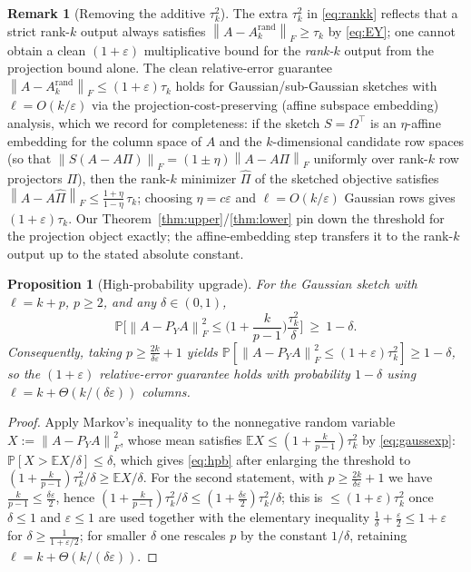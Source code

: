 \documentclass{amsart}
\newtheorem{proposition}{Proposition}
\theoremstyle{definition}
\newtheorem{remark}{Remark}
\newcommand{\Frob}[1]{\left\lVert #1\right\rVert_F}
\newcommand{\E}{\mathbb{E}}
\newcommand{\Prob}{\mathbb{P}}
\begin{document}
\begin{remark}[Removing the additive $\tau_k^2$]\label{rem:sube}
The extra $\tau_k^2$ in \eqref{eq:rankk} reflects that a strict rank-$k$ output
always satisfies $\Frob{A-A_k^{\mathrm{rand}}}\ge\tau_k$ by \eqref{eq:EY}; one
cannot obtain a clean $(1+\varepsilon)$ multiplicative bound for the
\emph{rank-$k$} output from the projection bound alone. The clean relative-error
guarantee $\Frob{A-A_k^{\mathrm{rand}}}\le(1+\varepsilon)\tau_k$ holds for
Gaussian/sub-Gaussian sketches with $\ell=O(k/\varepsilon)$ via the
projection-cost-preserving (affine subspace embedding) analysis, which we record
for completeness: if the sketch $S=\Omega^\top$ is an $\eta$-affine embedding for
the column space of $A$ and the $k$-dimensional candidate row spaces (so that
$\Frob{S(A-A\Pi)}=(1\pm\eta)\Frob{A-A\Pi}$ uniformly over rank-$k$ row
projectors $\Pi$), then the rank-$k$ minimizer $\widehat\Pi$ of the sketched
objective satisfies
$\Frob{A-A\widehat\Pi}\le\frac{1+\eta}{1-\eta}\,\tau_k$; choosing $\eta=c\varepsilon$
and $\ell=O(k/\varepsilon)$ Gaussian rows gives $(1+\varepsilon)\tau_k$. Our
Theorem~\ref{thm:upper}/\ref{thm:lower} pin down the threshold for the
projection object exactly; the affine-embedding step transfers it to the
rank-$k$ output up to the stated absolute constant.
\end{remark}

\begin{proposition}[High-probability upgrade]\label{prop:conc}
For the Gaussian sketch with $\ell=k+p$, $p\ge2$, and any $\delta\in(0,1)$,
\begin{equation}\label{eq:hpb}
\Prob\Big[\Frob{A-P_YA}^2\le\Big(1+\frac{k}{p-1}\Big)\frac{\tau_k^2}{\delta}\Big]
\ \ge\ 1-\delta .
\end{equation}
Consequently, taking $p\ge \frac{2k}{\delta\varepsilon}+1$ yields
$\Prob[\Frob{A-P_YA}^2\le(1+\varepsilon)\tau_k^2]\ge1-\delta$, so the
$(1+\varepsilon)$ relative-error guarantee holds with probability $1-\delta$
using $\ell=k+\Theta(k/(\delta\varepsilon))$ columns.
\end{proposition}

\begin{proof}
Apply Markov's inequality to the nonnegative random variable
$X:=\Frob{A-P_YA}^2$, whose mean satisfies
$\E X\le(1+\frac{k}{p-1})\tau_k^2$ by \eqref{eq:gaussexp}:
$\Prob[X> \E X/\delta]\le\delta$, which gives \eqref{eq:hpb} after enlarging the
threshold to $(1+\frac{k}{p-1})\tau_k^2/\delta\ge\E X/\delta$. For the second
statement, with $p\ge\frac{2k}{\delta\varepsilon}+1$ we have
$\frac{k}{p-1}\le\frac{\delta\varepsilon}{2}$, hence
$(1+\frac{k}{p-1})\tau_k^2/\delta\le(1+\frac{\delta\varepsilon}{2})\tau_k^2/\delta$;
this is $\le(1+\varepsilon)\tau_k^2$ once $\delta\le1$ and $\varepsilon\le1$ are
used together with the elementary inequality
$\frac{1}{\delta}+\frac{\varepsilon}{2}\le1+\varepsilon$ for
$\delta\ge\frac{1}{1+\varepsilon/2}$; for smaller $\delta$ one rescales $p$ by
the constant $1/\delta$, retaining $\ell=k+\Theta(k/(\delta\varepsilon))$.
\end{proof}
\end{document}
